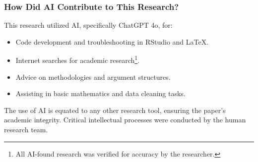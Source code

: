 \documentclass{beamer}
\begin{document}
\begin{frame}
\frametitle{How Did AI Contribute to This Research?}
\small
This research utilized AI, specifically ChatGPT 4o, for:

\begin{itemize}
  \item Code development and troubleshooting in RStudio and LaTeX.
  \item Internet searches for academic research\footnote{All AI-found research was verified for accuracy by the researcher.}.
  \item Advice on methodologies and argument structures.
  \item Assisting in basic mathematics and data cleaning tasks.
\end{itemize}

The use of AI is equated to any other research tool, ensuring the paper's academic integrity. Critical intellectual processes were conducted by the human research team.
\end{frame}
\end{document}
